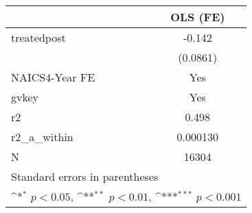 {
\def\sym#1{\ifmmode^{#1}\else\(^{#1}\)\fi}
\begin{tabular}{l*{1}{c}}
\hline\hline
            &\multicolumn{1}{c}{OLS (FE)}\\
\hline
treatedpost &      -0.142         \\
            &    (0.0861)         \\
[1em]
NAICS4-Year FE&         Yes         \\
[1em]
gvkey       &         Yes         \\
\hline
r2          &       0.498         \\
r2\_a\_within &    0.000130         \\
N           &       16304         \\
\hline\hline
\multicolumn{2}{l}{\footnotesize Standard errors in parentheses}\\
\multicolumn{2}{l}{\footnotesize \sym{*} \(p<0.05\), \sym{**} \(p<0.01\), \sym{***} \(p<0.001\)}\\
\end{tabular}
}
